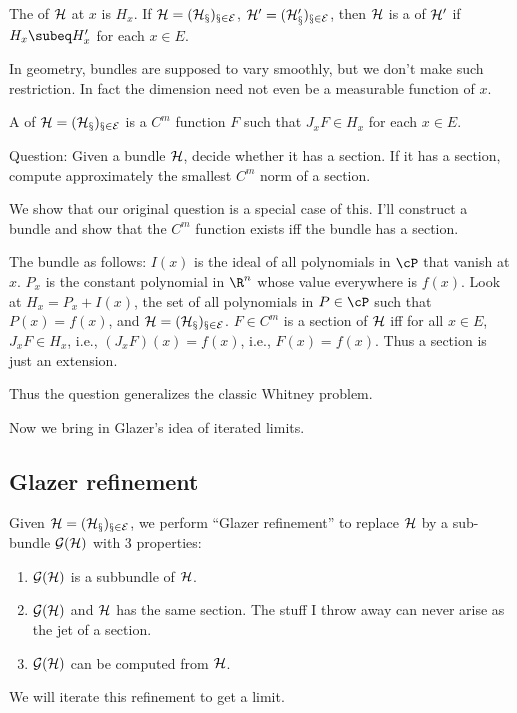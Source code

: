 \begin{df}
The  of $\cal H$ at $x$ is $H_x$. If $\cal H=(H_x)_{x\in E}$, $\cal H'=(H_x')_{x\in E}$, then $\cal H$ is a  of $\cal H'$ if $H_x\subeq H_x'$ for each $x\in E$. 
\end{df}
In geometry, bundles are supposed to vary smoothly, but we don't make such restriction. In fact the dimension need not even be a measurable function of $x$.
\begin{df}
A  of $\cal H=(H_x)_{x\in E}$ is a $C^m$ function $F$ such that $J_xF\in H_x$ for each $x\in E$. 
\end{df}
Question: Given a bundle $\cal H$, decide whether it has a section. If it has a section, compute approximately the smallest $C^m$ norm of a section. 

We show that our original question is a special case of this.
I'll construct a bundle and show that the $C^m$ function exists iff the bundle has a section.

The bundle as follows: $I(x)$ is the ideal of all polynomials in $\cP$ that vanish at $x$. $P_x$ is the constant polynomial in $\R^n$ whose value everywhere is $f(x)$. 
Look at $H_x=P_x+I(x)$, the set of all polynomials in $P\in \cP$ such that $P(x)=f(x)$, and $\cal H=(H_x)_{x\in E}$. $F\in C^m$ is a section of $\cal H$ iff for all $x\in E$, $J_xF\in H_x$, i.e., $(J_xF)(x)=f(x)$, i.e., $F(x)=f(x)$. Thus a section is just an extension. 

Thus the question generalizes the classic Whitney problem.

Now we bring in Glazer's idea of iterated limits. 
\subsection{Glazer refinement}

Given $\cal H=(H_x)_{x\in E}$, we perform ``Glazer refinement'' to replace $\cal H$ by a sub-bundle $\cal G(\cal H)$ with 3 properties:
\begin{enumerate}
\item
$\cal G(\cal H)$ is a subbundle of $\cal H$.
\item
$\cal G(\cal H)$ and $\cal H$ has the same section. The stuff I throw away can never arise as the jet of a section.
\item
$\cal G(H)$ can be computed from $\cal H$.
\end{enumerate}
We will iterate this refinement to get a limit.

